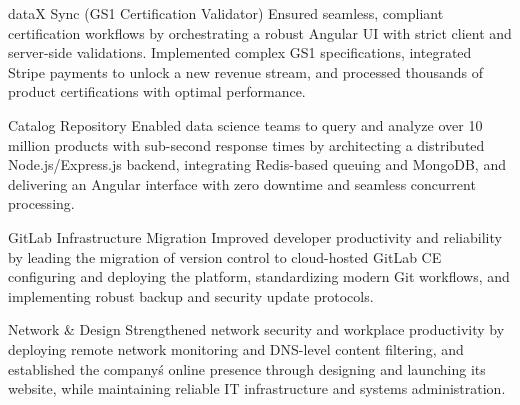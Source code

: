 \begin{sectionContainer}
	{dataX Sync (GS1 Certification Validator)} {Ensured seamless, compliant certification workflows} {by orchestrating a robust Angular UI with strict client and server-side validations. Implemented complex GS1 specifications, integrated Stripe payments to unlock a new revenue stream, and processed thousands of product certifications with optimal performance.}
\end{sectionContainer}

\begin{sectionContainer}
	{Catalog Repository} {Enabled data science teams to query and analyze over 10 million products} {with sub-second response times by architecting a distributed Node.js/Express.js backend, integrating Redis-based queuing and MongoDB, and delivering an Angular interface with zero downtime and seamless concurrent processing.}
\end{sectionContainer}

\begin{sectionContainer}
	{GitLab Infrastructure Migration} {Improved developer productivity and reliability} {by leading the migration of version control to cloud-hosted GitLab CE configuring and deploying the platform, standardizing modern Git workflows, and implementing robust backup and security update protocols.}
\end{sectionContainer}


\begin{sectionContainer}
	{Network \& Design} {Strengthened network security and workplace productivity} {by deploying remote network monitoring and DNS-level content filtering, and established the company\'s online presence through designing and launching its website, while maintaining reliable IT infrastructure and systems administration.}
\end{sectionContainer}
\nopagebreak[4]